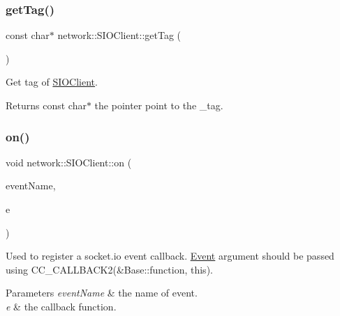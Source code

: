\subsubsection{\texorpdfstring{get\+Tag()}{getTag()}\hspace{0.1cm}{\footnotesize\ttfamily [2/2]}}
{\footnotesize\ttfamily const char$\ast$ network\+::\+S\+I\+O\+Client\+::get\+Tag (\begin{DoxyParamCaption}{ }\end{DoxyParamCaption})\hspace{0.3cm}{\ttfamily [inline]}}

Get tag of \hyperlink{classnetwork_1_1SIOClient}{S\+I\+O\+Client}. \begin{DoxyReturn}{Returns}
const char$\ast$ the pointer point to the \+\_\+tag. 
\end{DoxyReturn}
\mbox{\label{classnetwork_1_1SIOClient_af598d6039c7de3a591e628f754a38d9e}} 
\subsubsection{\texorpdfstring{on()}{on()}\hspace{0.1cm}{\footnotesize\ttfamily [1/2]}}
{\footnotesize\ttfamily void network\+::\+S\+I\+O\+Client\+::on (\begin{DoxyParamCaption}\item[{const std\+::string \&}]{event\+Name,  }\item[{S\+I\+O\+Event}]{e }\end{DoxyParamCaption})}

Used to register a socket.\+io event callback. \hyperlink{classEvent}{Event} argument should be passed using C\+C\+\_\+\+C\+A\+L\+L\+B\+A\+C\+K2(\&\+Base\+::function, this). 
\begin{DoxyParams}{Parameters}
{\em event\+Name} & the name of event. \\
\hline
{\em e} & the callback function. \\
\hline
\end{DoxyParams}
\mbox{\label{classnetwork_1_1SIOClient_af598d6039c7de3a591e628f754a38d9e}} 
